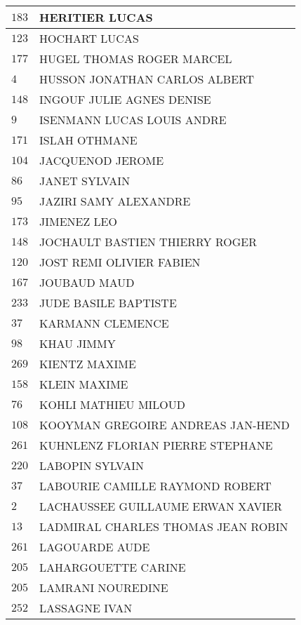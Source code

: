 \begin{xltabular}{\linewidth}{|l|X|}
    \hline
    $183$ & HERITIER LUCAS \\
    \hline
    $123$ & HOCHART LUCAS \\
    \hline
    $177$ & HUGEL THOMAS ROGER MARCEL \\
    \hline
    $4$ & HUSSON JONATHAN CARLOS ALBERT \\
    \hline
    $148$ & INGOUF JULIE AGNES DENISE \\
    \hline
    $9$ & ISENMANN LUCAS LOUIS ANDRE \\
    \hline
    $171$ & ISLAH OTHMANE \\
    \hline
    $104$ & JACQUENOD JEROME \\
    \hline
    $86$ & JANET SYLVAIN \\
    \hline
    $95$ & JAZIRI SAMY ALEXANDRE \\
    \hline
    $173$ & JIMENEZ LEO \\
    \hline
    $148$ & JOCHAULT BASTIEN THIERRY ROGER \\
    \hline
    $120$ & JOST REMI OLIVIER FABIEN \\
    \hline
    $167$ & JOUBAUD MAUD \\
    \hline
    $233$ & JUDE BASILE BAPTISTE \\
    \hline
    $37$ & KARMANN CLEMENCE \\
    \hline
    $98$ & KHAU JIMMY \\
    \hline
    $269$ & KIENTZ MAXIME \\
    \hline
    $158$ & KLEIN MAXIME \\
    \hline
    $76$ & KOHLI MATHIEU MILOUD \\
    \hline
    $108$ & KOOYMAN GREGOIRE ANDREAS JAN-HEND \\
    \hline
    $261$ & KUHNLENZ FLORIAN PIERRE STEPHANE \\
    \hline
    $220$ & LABOPIN SYLVAIN \\
    \hline
    $37$ & LABOURIE CAMILLE RAYMOND ROBERT \\
    \hline
    $2$ & LACHAUSSEE GUILLAUME ERWAN XAVIER \\
    \hline
    $13$ & LADMIRAL CHARLES THOMAS JEAN ROBIN \\
    \hline
    $261$ & LAGOUARDE AUDE \\
    \hline
    $205$ & LAHARGOUETTE CARINE \\
    \hline
    $205$ & LAMRANI NOUREDINE \\
    \hline
    $252$ & LASSAGNE IVAN \\

\end{xltabular}
